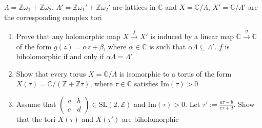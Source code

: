 \documentclass[main]{subfiles}
\begin{document}
\begin{exercise}
$\Lambda=\mathbb Z\omega_1+\mathbb Z\omega_2$, $\Lambda'=\mathbb Z\omega_1'+\mathbb Z\omega_2'$ are lattices in $\mathbb C$ and $X=\mathbb C/\Lambda$, $X'=\mathbb C/\Lambda'$ are the corresponding complex tori
\begin{enumerate}[label=\textbf{\arabic*.}, leftmargin=*]
\item Prove that any holomorphic map $X\xrightarrow f X'$ is induced by a linear map $\mathbb C\xrightarrow g\mathbb C$ of the form $g(z)=\alpha z + \beta$, where
$\alpha\in \mathbb C$ is such that $\alpha\Lambda\subseteq \Lambda'$. $f$ is biholomorphic if and only if $\alpha\Lambda = \Lambda'$
\item Show that every torus $X=\mathbb C/\Lambda$ is isomorphic to a torus of the form $X(\tau)=\mathbb C/(\mathbb Z+\mathbb Z\tau)$, where $\tau\in\mathbb C$ satisfies $\mathrm{Im}(\tau)>0$
\item Assume that $\left(\begin{array}{cc} a & b \\ c &
  d \end{array}\right)\in\mathrm{SL}(2,\mathbb Z)$ and $\mathrm{Im}(\tau)>0$. Let $\displaystyle \tau':=\frac{a\tau + b}{c\tau +d}$. Show that the tori $X(\tau)$ and $X(\tau')$ are biholomorphic
\end{enumerate}
\end{exercise}
\end{document}
